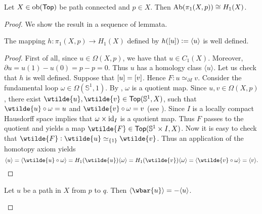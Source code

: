 \begin{theorem}
	Let $X \in \operatorname{ob}(\mathsf{Top})$ be path connected and $p \in X$. Then $\operatorname{Ab}(\pi_1(X,p)) \cong H_1(X)$.
	\label{thm:Hurewicz_theorem}
\end{theorem}

\begin{proof}
	We show the result in a sequence of lemmata.
	\begin{lemma}
		The mapping $h : \pi_1(X,p) \to H_1(X)$ defined by $h(\sbr{u}) := \langle u \rangle$ is well defined.
	\end{lemma}

	\begin{proof}
		First of all, since $u \in \Omega(X,p)$, we have that $u \in C_1(X)$. Moreover, $\partial u = u(1) - u(0) = p - p = 0$. Thus $u$ has a homology class $\langle u \rangle$. Let us check that $h$ is well defined. Suppose that $\sbr{u} = \sbr{v}$. Hence $F : u \simeq_{\partial I} v$. Consider the fundamental loop $\omega \in \Omega(\mathbb{S}^1,1)$. By \cite[70]{lee:topological_manifolds:2011}, $\omega$ is a quotient map. Since $u,v \in \Omega(X,p)$, there exist $\wtilde{u},\wtilde{v} \in \mathsf{Top}(\mathbb{S}^1,X)$, such that $\wtilde{u} \circ \omega = u$ and $\wtilde{v} \circ \omega = v$ (see \cite[72]{lee:topological_manifolds:2011}). Since $I$ is a locally compact Hausdorff space \cite[107]{lee:topological_manifolds:2011} implies that $\omega \times \operatorname{id}_I$ is a quotient map. Thus $F$ passes to the quotient and yields a map $\wtilde{F} \in \mathsf{Top}(\mathbb{S}^1 \times I,X)$. Now it is easy to check that $\wtilde{F} : \wtilde{u} \simeq_{\cbr{1}} \wtilde{v}$. Thus an application of the homotopy axiom yields
		\begin{equation*}
			\langle u \rangle = \langle \wtilde{u} \circ \omega \rangle = H_1(\wtilde{u})\langle \omega \rangle = H_1(\wtilde{v})\langle \omega \rangle = \langle \wtilde{v} \circ \omega \rangle = \langle v \rangle.
		\end{equation*}
	\end{proof}

	\begin{lemma}
		Let $u$ be a path in $X$ from $p$ to $q$. Then $\langle \wbar{u}\rangle = - \langle u\rangle$.
		\label{lem:reverse_path_homology}
	\end{lemma}


\end{proof}
